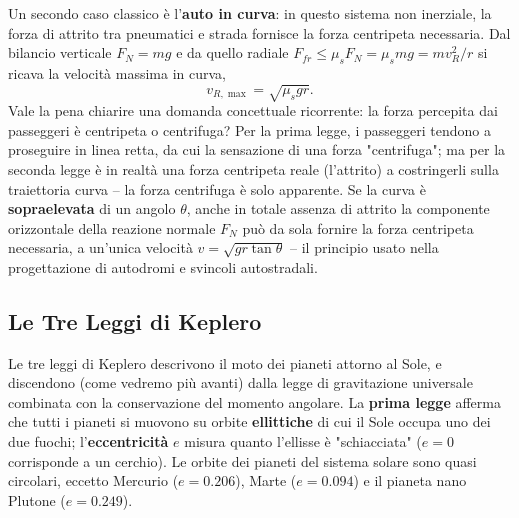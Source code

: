 \documentclass[a4paper,11pt]{article}
\begin{document}
\begin{center}
\end{center}

Un secondo caso classico è l'\textbf{auto in curva}: in questo sistema non inerziale, la forza di attrito tra pneumatici e strada fornisce la forza centripeta necessaria. Dal bilancio verticale $F_N=mg$ e da quello radiale $F_{fr}\leq\mu_sF_N=\mu_smg=mv_R^2/r$ si ricava la velocità massima in curva,
\[
v_{R,\max} = \sqrt{\mu_s g r}.
\]
Vale la pena chiarire una domanda concettuale ricorrente: la forza percepita dai passeggeri è centripeta o centrifuga? Per la prima legge, i passeggeri tendono a proseguire in linea retta, da cui la sensazione di una forza "centrifuga"; ma per la seconda legge è in realtà una forza centripeta reale (l'attrito) a costringerli sulla traiettoria curva -- la forza centrifuga è solo apparente. Se la curva è \textbf{sopraelevata} di un angolo $\theta$, anche in totale assenza di attrito la componente orizzontale della reazione normale $F_N$ può da sola fornire la forza centripeta necessaria, a un'unica velocità $v=\sqrt{gr\tan\theta}$ -- il principio usato nella progettazione di autodromi e svincoli autostradali.

\subsection{Le Tre Leggi di Keplero}

Le tre leggi di Keplero descrivono il moto dei pianeti attorno al Sole, e discendono (come vedremo più avanti) dalla legge di gravitazione universale combinata con la conservazione del momento angolare. La \textbf{prima legge} afferma che tutti i pianeti si muovono su orbite \textbf{ellittiche} di cui il Sole occupa uno dei due fuochi; l'\textbf{eccentricità} $e$ misura quanto l'ellisse è "schiacciata" ($e=0$ corrisponde a un cerchio). Le orbite dei pianeti del sistema solare sono quasi circolari, eccetto Mercurio ($e=0.206$), Marte ($e=0.094$) e il pianeta nano Plutone ($e=0.249$).
\end{document}
